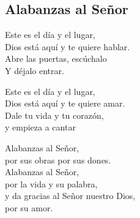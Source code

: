 \subsection{Alabanzas al Señor}

\begin{center}

{\Large

Este es el día y el lugar,\\
Dios está aquí y te quiere hablar.\\
Abre las puertas, escúchalo\\
Y déjalo entrar.\\
\vspace{2em}

Este es el día y el lugar,\\
Dios está aquí y te quiere amar.\\
Dale tu vida y tu corazón,\\
y empieza a cantar\\
\vspace{2em}

Alabanzas al Señor,\\
por sus obras por sus dones.\\
Alabanzas al Señor,\\
por la vida y su palabra,\\
y da gracias al Señor nuestro Dios,\\
por su amor.\\

}\end{center}
